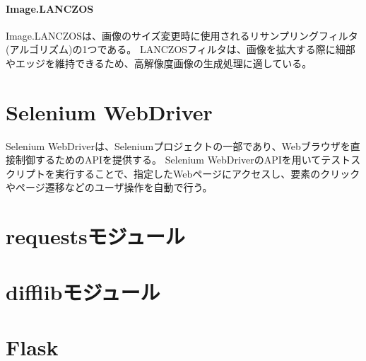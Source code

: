 \paragraph{Image.LANCZOS}
Image.LANCZOSは、画像のサイズ変更時に使用されるリサンプリングフィルタ(アルゴリズム)の1つである\cite{LANCZOS}。
LANCZOSフィルタは、画像を拡大する際に細部やエッジを維持できるため、高解像度画像の生成処理に適している。

\section{Selenium WebDriver}\label{sec:Selenium_WebDriver}
Selenium WebDriver\cite{Selenium WebDriver}は、Seleniumプロジェクト\cite{Selenium}の一部であり、Webブラウザを直接制御するためのAPIを提供する。
Selenium WebDriverのAPIを用いてテストスクリプトを実行することで、指定したWebページにアクセスし、要素のクリックやページ遷移などのユーザ操作を自動で行う。

\section{requestsモジュール}\label{sec:requests}

\section{difflibモジュール}\label{sec:difflib}

\section{Flask}\label{sec:Flask}